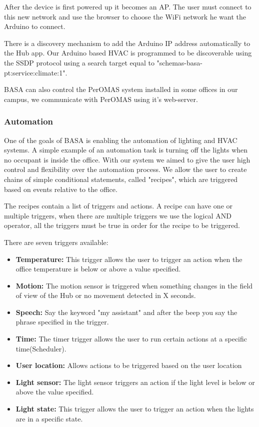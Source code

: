 \documentclass[conference]{IEEEtran}
\begin{document}
After the device is first powered up it becomes an \ac{AP}. The user must connect to this new network and use the browser to choose the \ac{WiFi} network he want the Arduino to connect.

There is a discovery mechanism to add the Arduino IP address automatically to the Hub app. Our Arduino based HVAC is programmed to be discoverable using the \ac{SSDP} protocol using a search target equal to "schemas-basa-pt:service:climate:1".

BASA can also control the PerOMAS system installed in some offices in our campus, we communicate with PerOMAS using it's web-server.

\subsubsection{Automation}

One of the goals of BASA is enabling the automation of lighting and \ac{HVAC} systems. A simple example of an automation task is turning off the lights when no occupant is inside the office.
With our system we aimed to give the user high control and flexibility over the automation process. We allow the user to create chains of simple conditional statements, called "recipes", which are triggered based on events relative to the office.

The recipes contain a list of triggers and actions. A recipe can have one or multiple triggers, when there are multiple triggers we use the logical AND operator, all the triggers must be true in order for the recipe to be triggered.

There are seven triggers available:

\begin{itemize}
  \item \textbf{Temperature:} This trigger allows the user to trigger an action when the office temperature is below or above a value specified.
  \item \textbf{Motion:} The motion sensor is triggered when something changes in the field of view of the Hub or no movement detected in X seconds.
  \item \textbf{Speech:} Say the keyword "my assistant" and after the beep you say the phrase specified in the trigger.  
  \item \textbf{Time:} The timer trigger allows the user to run certain actions at a specific time(Scheduler).  
  \item \textbf{User location:} Allows actions to be triggered based on the user location
  \item \textbf{Light sensor:} The light sensor triggers an action if the light level is below or above the value specified.
  \item \textbf{Light state:} This trigger allows the user to trigger an action when the lights are in a specific state.
  
\end{itemize}
\end{document}
